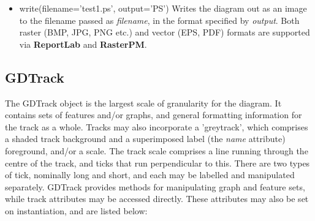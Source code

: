 \documentclass{article}
\begin{document}
\begin{itemize}
\begin{itemize}
	to begin drawing the diagram.
	\item \textit{end} is in int indicating the base position at which 
	to stop drawing the diagram.
	\item \textit{track\us size} is a float specifying what proportion of 
	the vertical space available to each track should be taken up by 
	the drawing of the track (default=0.75).
	\item \textit{tracklines} is a Boolean indicating whether a set of 
	lines delineating each track should be superimposed on the diagram 
	(default=0).
	\item \textit{fragments} is an integer specifying how many sections 
	the sequence should be divided into on a linear diagram.  This is 
	necessary for clarity, to avoid unreadable compression of diagram 
	information in the X direction (default=10).
	\item \textit{fragment\us size} is a float specifying what proportion 
	of the vertical space available to each fragment should be taken up 
	by the drawing of the fragmwriteent (default=0.9).
	\item \textit{circular} is a Boolean value describing whether the 
	sequence to be drawn is circular or not - this is only directly 
	relevant to circular diagrams.
\end{itemize}
The parameters listed above are also attributes of the object which may be 
accessed directly.

Once drawn, the diagram remains 'virtual' in memory until written out to file.  
Once the draw() method is called, if the diagram is modified, the draw() 
method must be called again before the changes are applied.

\item {write(filename='test1.ps', output='PS')}
Writes the diagram out as an image to the filename passed as 
\textit{filename}, in the format specified by \textit{output}.  Both raster 
(BMP, JPG, PNG etc.) and vector (EPS, PDF) formats are supported via 
\textbf{ReportLab} and \textbf{RasterPM}.
\end{itemize}


\subsection{GDTrack}
The GDTrack object is the largest scale of granularity for the diagram.  It 
contains sets of features and/or graphs, and general formatting information 
for the track as a whole.  Tracks may also incorporate a 'greytrack', which 
comprises a shaded track background and a superimposed label (the 
\textit{name} attribute) foreground, and/or a scale.  The track scale 
comprises a line running through the centre of the track, and ticks that 
run perpendicular to this.  There are two types of tick, nominally long and 
short, and each may be labelled and manipulated separately.
GDTrack provides methods for manipulating graph and 
feature sets, while track attributes may be accessed directly.  These 
attributes may also be set on instantiation, and are listed below:
\end{document}
